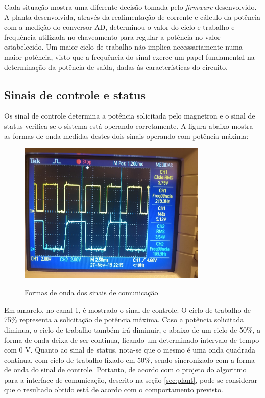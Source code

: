Cada situação mostra uma diferente decisão tomada pelo \textit{firmware} desenvolvido. A planta desenvolvida, através da realimentação de corrente e cálculo da potência com a medição do conversor AD, determinou o valor do ciclo e trabalho e frequência utilizada no chaveamento para regular a potência no valor estabelecido. Um maior ciclo de trabalho não implica necessariamente numa maior potência, visto que a frequência do sinal exerce um papel fundamental na determinação da potência de saída, dadas às características do circuito.

\subsection{Sinais de controle e status}
Os sinal de controle determina a potência solicitada pelo magnetron e o sinal de status verifica se o sistema está operando corretamente. A figura abaixo mostra as formas de onda medidas destes dois sinais operando com potência máxima:

\begin{figure}[H]
    \centering
    \caption{Formas de onda dos sinais de comunicação}
    \includegraphics[width=0.8\textwidth]{./dados/figuras/onda_comm}
    \label{fig:figura-onda_comm}
\end{figure}

Em amarelo, no canal 1, é mostrado o sinal de controle. O ciclo de trabalho de 75\% representa a solicitação de potência máxima. Caso a potência solicitada diminua, o ciclo de trabalho também irá diminuir, e abaixo de um ciclo de 50\%, a forma de onda deixa de ser continua, ficando um determinado intervalo de tempo com 0 V. Quanto ao sinal de status, nota-se que o mesmo é uma onda quadrada contínua, com ciclo de trabalho fixado em 50\%, sendo sincronizado com a forma de onda do sinal de controle. Portanto, de acordo com o projeto do algoritmo para a interface de comunicação, descrito na seção \ref{sec:plant}, pode-se considerar que o resultado obtido está de acordo com o comportamento previsto.


